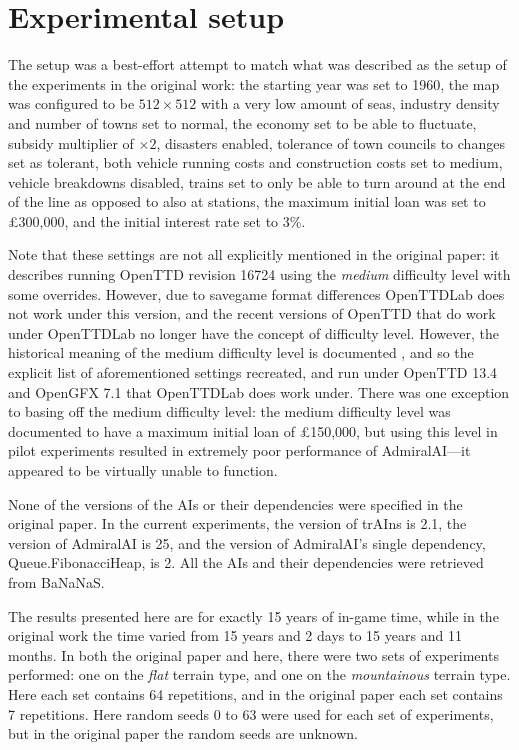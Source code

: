 \documentclass[logo,msc,dsti]{style/infthesis}    %
\begin{document}
{\section{Experimental setup}

The setup was a best-effort attempt to match what was described as the setup of the experiments in the original work: the starting year was set to 1960, the map was configured to be $512 \times 512$ with a very low amount of seas, industry density and number of towns set to normal, the economy set to be able to fluctuate, subsidy multiplier of $\times 2$, disasters enabled, tolerance of town councils to changes set as tolerant, both vehicle running costs and construction costs set to medium, vehicle breakdowns disabled, trains set to only be able to turn around at the end of the line as opposed to also at stations, the maximum initial loan was set to £300,000, and the initial interest rate set to 3\%.

Note that these settings are not all explicitly mentioned in the original paper: it describes running OpenTTD revision 16724 using the \emph{medium} difficulty level with some overrides. However, due to savegame format differences OpenTTDLab does not work under this version, and the recent versions of OpenTTD that do work under OpenTTDLab no longer have the concept of difficulty level. However, the historical meaning of the medium difficulty level is documented \cite{OpenTTDDifficultyLevels}, and so the explicit list of aforementioned settings recreated, and run under OpenTTD 13.4 and OpenGFX 7.1 that OpenTTDLab does work under. There was one exception to basing off the medium difficulty level: the medium difficulty level was documented to have a maximum initial loan of £150,000, but using this level in pilot experiments resulted in extremely poor performance of AdmiralAI---it appeared to be virtually unable to function.

None of the versions of the AIs or their dependencies were specified in the original paper. In the current experiments, the version of trAIns is 2.1,  the version of AdmiralAI is 25, and the version of AdmiralAI's single dependency, Queue.FibonacciHeap, is 2. All the AIs and their dependencies were retrieved from BaNaNaS.

The results presented here are for exactly 15 years of in-game time, while in the original work the time varied from 15 years and 2 days to 15 years and 11 months. In both the original paper and here, there were two sets of experiments performed: one on the \emph{flat} terrain type, and one on the \emph{mountainous} terrain type. Here each set contains 64 repetitions, and in the original paper each set contains 7 repetitions. Here random seeds 0 to 63 were used for each set of experiments, but in the original paper the random seeds are unknown.

}
\end{document}
